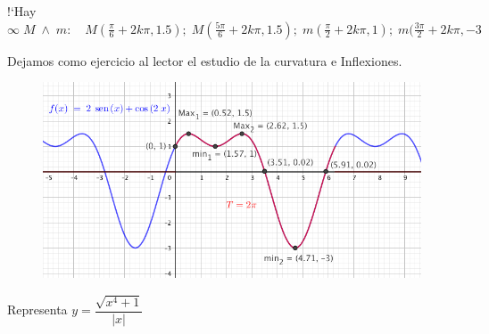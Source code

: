 \begin{proofw}
!`Hay $\infty \; M \; \wedge \; m: \quad M(\frac \pi 6 + 2k\pi, 1.5); \; M(\frac {5\pi}{6} +2k\pi,1.5); \; m(\frac \pi 2 + 2k\pi, 1); \; m(\frac {3\pi}{2}+2k\pi, -3$ 

Dejamos como ejercicio al lector el estudio de la curvatura e Inflexiones.

	\begin{figure}[H]
		\centering
		\includegraphics[width=.8\textwidth]{imagenes/imagenes05/T05IM39.png}
	\end{figure}
	
\end{proofw}

\begin{ejre} Representa $y=\dfrac {\sqrt{x^4+1}}{|x|}$
	
\end{ejre}

